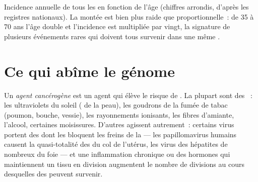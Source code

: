 \begin{omfigure}

{\small Incidence annuelle de tous les  en fonction de l'âge
(chiffres arrondis, d'après les registres nationaux). La montée est
bien plus raide que proportionnelle~: de 35 à 70 ans l'âge double et
l'incidence est multipliée par vingt, la signature de plusieurs
événements rares qui doivent tous survenir dans une même .}
\end{omfigure}

\section{Ce qui abîme le génome}

\begin{definition}\label{def:g11:cancer:carcinogen}
Un \emph{agent cancérogène} est un agent qui
élève le risque de . La plupart sont des ~: les
ultraviolets du soleil ( de la peau), les goudrons de la fumée
de tabac (poumon, bouche, vessie), les rayonnements ionisants, les
fibres d'amiante, l'alcool, certaines moisissures. D'autres agissent
autrement~: certains virus portent des  dont les 
bloquent les freins de la  --- les papillomavirus humains
causent la quasi-totalité des  du col de l'utérus, les virus des
hépatites de nombreux  du foie --- et une inflammation
chronique ou des hormones qui maintiennent un tissu en division
augmentent le nombre de divisions au cours desquelles des 
peuvent survenir.
\end{definition}

